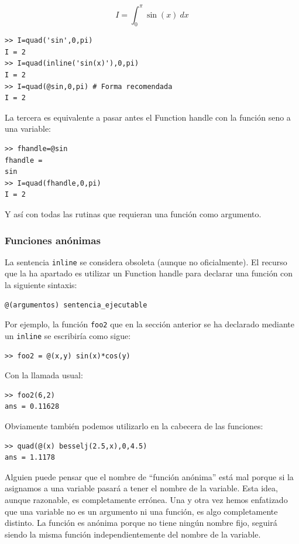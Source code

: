 $$I=\int_{0}^{\pi}\sin(x)\ dx$$


\begin{lstlisting}
>> I=quad('sin',0,pi)
I = 2
>> I=quad(inline('sin(x)'),0,pi)
I = 2
>> I=quad(@sin,0,pi) # Forma recomendada
I = 2
\end{lstlisting}
La tercera es equivalente a pasar antes el Function handle con la
función seno a una variable:

  \begin{lstlisting}
>> fhandle=@sin
fhandle =
sin
>> I=quad(fhandle,0,pi)
I = 2
\end{lstlisting}
Y así con todas las rutinas que requieran una función como argumento.


\subsubsection{Funciones anónimas}

La sentencia \texttt{inline} se considera obsoleta (aunque no
oficialmente).  El recurso que la ha apartado es utilizar un Function
handle para declarar una función con la siguiente sintaxis:

\begin{lstlisting}
@(argumentos) sentencia_ejecutable
\end{lstlisting}
Por ejemplo, la función \texttt{foo2} que en la sección anterior se ha
declarado mediante un \texttt{inline} se escribiría como sigue:

\begin{lstlisting}
>> foo2 = @(x,y) sin(x)*cos(y)
\end{lstlisting}
Con la llamada usual:

\begin{lstlisting}
>> foo2(6,2)
ans = 0.11628
\end{lstlisting}
Obviamente también podemos utilizarlo en la cabecera de las funciones:

\begin{lstlisting}
>> quad(@(x) besselj(2.5,x),0,4.5)
ans = 1.1178
\end{lstlisting}
Alguien puede pensar que el nombre de {}``función anónima'' está mal
porque si la asignamos a una variable pasará a tener el nombre de la
variable. Esta idea, aunque razonable, es completamente errónea.  Una
y otra vez hemos enfatizado que una variable no es un argumento ni una
función, es algo completamente distinto. La función es anónima porque
no tiene ningún nombre fijo, seguirá siendo la misma función
independientemente del nombre de la variable.

